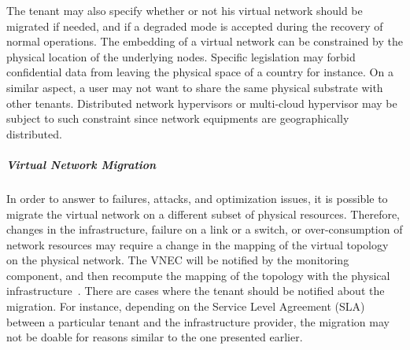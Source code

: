 The tenant may also specify whether or not his virtual network should be migrated if needed, and if a degraded mode is accepted during the recovery of normal operations.
The embedding of a virtual network can be constrained by the physical location of the underlying nodes.
Specific legislation may forbid confidential data from leaving the physical space of a country for instance.
On a similar aspect, a user may not want to share the same physical substrate with other tenants.
Distributed network hypervisors or multi-cloud hypervisor may be subject to such constraint since network equipments are geographically distributed.



\subparagraph{Virtual Network Migration}
In order to answer to failures, attacks, and optimization issues, it is possible to migrate the virtual network on a different subset of physical resources. 
Therefore, changes in the infrastructure, failure on a link or a switch, or over-consumption of network resources may require a change in the mapping of the virtual topology on the physical network.
The VNEC will be notified by the monitoring component, and then recompute the mapping of the topology with the physical infrastructure~\cite{VeRTIGO-Corin2012a,AutoSlice-Bozakov2012,CoVisor-Jin2015}.
There are cases where the tenant should be notified about the migration.
For instance, depending on the Service Level Agreement (SLA) between a particular tenant and the infrastructure provider, the migration may not be doable for reasons similar to the one presented earlier.

